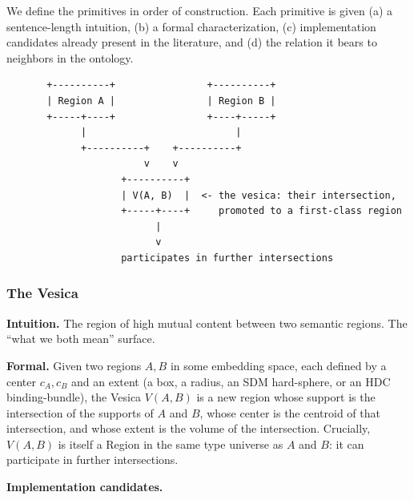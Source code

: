 \documentclass[11pt,a4paper]{article}
\begin{document}
We define the primitives in order of construction. Each primitive is given (a) a sentence-length intuition, (b) a formal characterization, (c) implementation candidates already present in the literature, and (d) the relation it bears to neighbors in the ontology.

\begin{verbatim}
       +----------+                +----------+
       | Region A |                | Region B |
       +-----+----+                +----+-----+
             |                          |
             +----------+    +----------+
                        v    v
                    +----------+
                    | V(A, B)  |  <- the vesica: their intersection,
                    +-----+----+     promoted to a first-class region
                          |
                          v
                    participates in further intersections
\end{verbatim}

\subsubsection*{The Vesica}

\textbf{Intuition.} The region of high mutual content between two semantic regions. The ``what we both mean'' surface.

\textbf{Formal.} Given two regions $A, B$ in some embedding space, each defined by a center $c_A, c_B$ and an extent (a box, a radius, an SDM hard-sphere, or an HDC binding-bundle), the Vesica $V(A, B)$ is a new region whose support is the intersection of the supports of $A$ and $B$, whose center is the centroid of that intersection, and whose extent is the volume of the intersection. Crucially, $V(A, B)$ is itself a Region in the same type universe as $A$ and $B$: it can participate in further intersections.

\textbf{Implementation candidates.}
\end{document}
